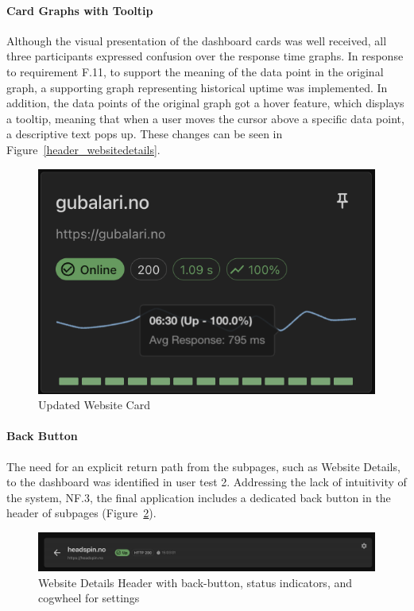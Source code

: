 \paragraph{Card Graphs with Tooltip}
Although the visual presentation of the dashboard cards was well received, all three participants expressed confusion over the response time graphs. In response to requirement F.11, to support the meaning of the data point in the original graph, a supporting graph representing historical uptime was implemented. In addition, the data points of the original graph got a hover feature, which displays a tooltip, meaning that when a user moves the cursor above a specific data point, a descriptive text pops up. These changes can be seen in Figure~\ref{header_websitedetails}.
\begin{figure}[H]
    \centering
    \includegraphics[width=1\linewidth]{figures/final_application/tooltip_responsetime_chart_card.png}
    \caption{Updated Website Card}
    \label{fig:updated_web_card}
\end{figure}

\paragraph{Back Button}
The need for an explicit return path from the subpages, such as Website Details, to the dashboard was identified in user test 2. Addressing the lack of intuitivity of the system, NF.3, the final application includes a dedicated back button in the header of subpages (Figure~\ref{fig:header_websitedetails}).

\begin{figure}[H]
    \centering
    \includegraphics[width=1\linewidth]{figures/header_websiteDetails.png}
    \caption{Website Details Header with back-button, status indicators, and cogwheel for settings}
    \label{fig:header_websitedetails}
\end{figure}

